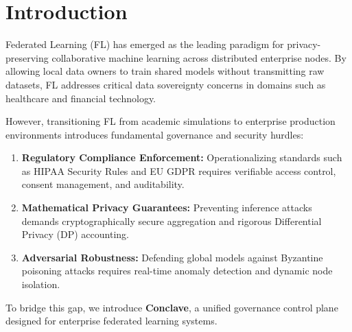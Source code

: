 \section{Introduction}
\label{sec:introduction}

Federated Learning (FL) has emerged as the leading paradigm for privacy-preserving collaborative machine learning across distributed enterprise nodes. By allowing local data owners to train shared models without transmitting raw datasets, FL addresses critical data sovereignty concerns in domains such as healthcare and financial technology.

However, transitioning FL from academic simulations to enterprise production environments introduces fundamental governance and security hurdles:
\begin{enumerate}
    \item \textbf{Regulatory Compliance Enforcement:} Operationalizing standards such as HIPAA Security Rules and EU GDPR requires verifiable access control, consent management, and auditability.
    \item \textbf{Mathematical Privacy Guarantees:} Preventing inference attacks demands cryptographically secure aggregation and rigorous Differential Privacy (DP) accounting.
    \item \textbf{Adversarial Robustness:} Defending global models against Byzantine poisoning attacks requires real-time anomaly detection and dynamic node isolation.
\end{enumerate}

To bridge this gap, we introduce \textbf{Conclave}, a unified governance control plane designed for enterprise federated learning systems.
